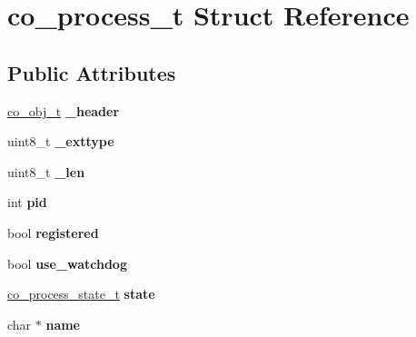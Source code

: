 \hypertarget{structco__process__t}{\section{co\+\_\+process\+\_\+t Struct Reference}
\label{structco__process__t}
}
\subsection*{Public Attributes}
\begin{DoxyCompactItemize}
\item 
\hypertarget{structco__process__t_a498c37443354b360d8af982467fa99f3}{\hyperlink{structco__obj__t}{co\+\_\+obj\+\_\+t} {\bfseries \+\_\+header}}\label{structco__process__t_a498c37443354b360d8af982467fa99f3}

\item 
\hypertarget{structco__process__t_ae59c7ea2da88b6ef67e4db865fc9515b}{uint8\+\_\+t {\bfseries \+\_\+exttype}}\label{structco__process__t_ae59c7ea2da88b6ef67e4db865fc9515b}

\item 
\hypertarget{structco__process__t_aac7e514517f5d27200141e65544585c8}{uint8\+\_\+t {\bfseries \+\_\+len}}\label{structco__process__t_aac7e514517f5d27200141e65544585c8}

\item 
\hypertarget{structco__process__t_a23ed7b90e7d7ed78eda3434aed55318c}{int {\bfseries pid}}\label{structco__process__t_a23ed7b90e7d7ed78eda3434aed55318c}

\item 
\hypertarget{structco__process__t_acc87aa46cf9ff28689abf1828b777682}{bool {\bfseries registered}}\label{structco__process__t_acc87aa46cf9ff28689abf1828b777682}

\item 
\hypertarget{structco__process__t_a83da7d301f6494aefc6b99554430397e}{bool {\bfseries use\+\_\+watchdog}}\label{structco__process__t_a83da7d301f6494aefc6b99554430397e}

\item 
\hypertarget{structco__process__t_ac332ad56c7321e1a1defe54b964fe327}{\hyperlink{process_8h_ad844b14a4717db2b1b1cbe65afb72db9}{co\+\_\+process\+\_\+state\+\_\+t} {\bfseries state}}\label{structco__process__t_ac332ad56c7321e1a1defe54b964fe327}

\item 
\hypertarget{structco__process__t_aea35e320f68d5bb2a505f0d5c35f30af}{char $\ast$ {\bfseries name}}\label{structco__process__t_aea35e320f68d5bb2a505f0d5c35f30af}


\end{DoxyCompactItemize}
